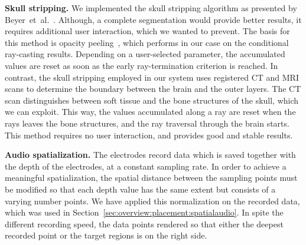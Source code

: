 \documentclass[journal]{vgtc}                %
\begin{document}
\noindent \textbf{Skull stripping.} We implemented the skull stripping algorithm as presented by Beyer~et~al.~\cite{Beyer2007}. Although, a complete segmentation would provide better results, it requires additional user interaction, which we wanted to prevent. The basis for this method is opacity peeling~\cite{Rezk-salama2006}, which performs in our case on the conditional ray-casting results. Depending on a user-selected parameter, the accumulated values are reset as soon as the early ray-termination criterion is reached. In contrast, the skull stripping employed in our system uses registered CT and MRI scans to determine the boundary between the brain and the outer layers. The CT scan distinguishes between soft tissue and the bone structures of the skull, which we can exploit. This way, the values accumulated along a ray are reset when the rays leaves the bone structures, and the ray traversal through the brain starts. This method requires no user interaction, and provides good and stable results.

\noindent \textbf{Audio spatialization.} The electrodes record data which is saved together with the depth of the electrodes, at a constant sampling rate. In order to achieve a meaningful spatialization, the spatial distance between the sampling points must be modified so that each depth value has the same extent but consists of a varying number points. We have applied this normalization on the recorded data, which was used in Section~\ref{sec:overview:placement:spatialaudio}. In spite the different recording speed, the data points rendered so that either the deepest recorded point or the target regions is on the right side.
\end{document}
